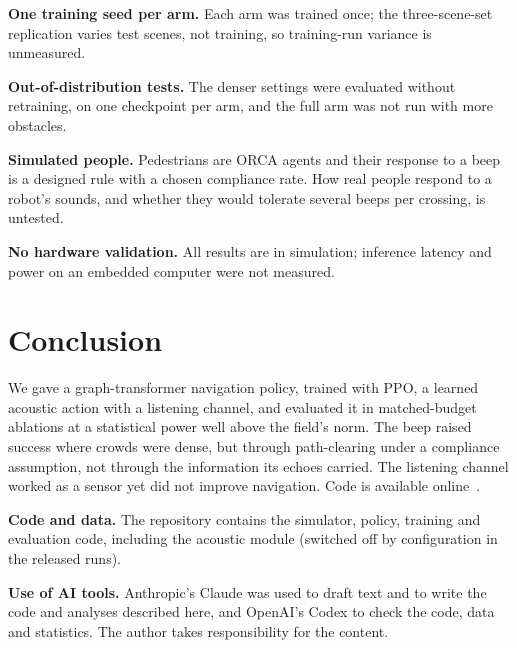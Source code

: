 \documentclass[conference]{IEEEtran}
\begin{document}
\textbf{One training seed per arm.} Each arm was trained once; the three-scene-set replication
varies test scenes, not training, so training-run variance is unmeasured.

\textbf{Out-of-distribution tests.} The denser settings were evaluated without retraining, on one
checkpoint per arm, and the full arm was not run with more obstacles.

\textbf{Simulated people.} Pedestrians are ORCA agents and their response to a beep is a
designed rule with a chosen compliance rate. How real people respond to a robot's sounds, and
whether they would tolerate several beeps per crossing, is untested.

\textbf{No hardware validation.} All results are in simulation; inference latency and power on
an embedded computer were not measured.

\section{Conclusion}

We gave a graph-transformer navigation policy, trained with PPO, a learned acoustic action with a
listening channel, and evaluated it in matched-budget ablations at a statistical power well above
the field's norm. The beep raised success where crowds were dense, but through path-clearing
under a compliance assumption, not through the information its echoes carried. The listening
channel worked as a sensor yet did not improve navigation. Code is available online~\cite{repo}.

\textbf{Code and data.} The repository contains the simulator, policy, training and evaluation
code, including the acoustic module (switched off by configuration in the released runs).

\textbf{Use of AI tools.} Anthropic's Claude was used to draft text and to write the code and
analyses described here, and OpenAI's Codex to check the code, data and statistics. The author
takes responsibility for the content.
\end{document}

